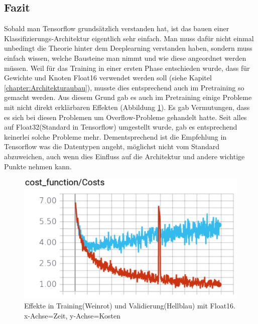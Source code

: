 \subsection{Fazit}
Sobald man Tensorflow grundsätzlich verstanden hat, ist das bauen einer Klassifizierungs-Architektur eigentlich sehr einfach. 
Man muss dafür nicht einmal unbedingt die Theorie hinter dem Deeplearning verstanden haben, sondern muss einfach wissen, welche Bausteine \grqq{}man\grqq{} nimmt und wie diese angeordnet werden müssen.
Weil für das Training in einer ersten Phase entschieden wurde, dass für Gewichte und Knoten Float16 verwendet werden soll (siehe Kapitel \ref{chapter:Architekturaubau}), musste dies entsprechend auch im Pretraining so gemacht werden. 
Aus diesem Grund gab es auch im Pretraining einige Probleme mit nicht direkt erklärbaren Effekten (Abbildung \ref{img:overflow_pretraining}).
Es gab Vermutungen, dass es sich bei diesen Problemen um Overflow-Probleme gehandelt hatte.
Seit alles auf Float32(Standard in Tensorflow) umgestellt wurde, gab es entsprechend keinerlei solche Probleme mehr.
Dementsprechend ist die Empfehlung in Tensorflow was die Datentypen angeht, möglichst nicht vom Standard abzuweichen, auch wenn dies Einfluss auf die Architektur und andere wichtige Punkte nehmen kann.
\begin{figure}
	\centering
	\includegraphics[width=.7\textwidth]{Kapitel/20Pretraining/Bilder/Overflow.pdf}
	\caption{Effekte in Training(Weinrot) und Validierung(Hellblau) mit Float16. x-Achse=Zeit, y-Achse=Kosten}
	\label{img:overflow_pretraining}
\end{figure}  
 